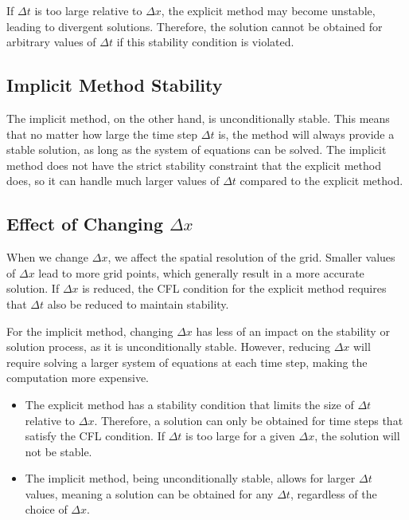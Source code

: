 \documentclass[12pt]{article}
\begin{document}
If \( \Delta t \) is too large relative to \( \Delta x \), the explicit method may become unstable, leading to divergent solutions. Therefore, the solution cannot be obtained for arbitrary values of \( \Delta t \) if this stability condition is violated.

\subsection*{Implicit Method Stability}
The implicit method, on the other hand, is unconditionally stable. This means that no matter how large the time step \( \Delta t \) is, the method will always provide a stable solution, as long as the system of equations can be solved. The implicit method does not have the strict stability constraint that the explicit method does, so it can handle much larger values of \( \Delta t \) compared to the explicit method.

\subsection*{Effect of Changing \( \Delta x \)}
When we change \( \Delta x \), we affect the spatial resolution of the grid. Smaller values of \( \Delta x \) lead to more grid points, which generally result in a more accurate solution. If \( \Delta x \) is reduced, the CFL condition for the explicit method requires that \( \Delta t \) also be reduced to maintain stability. 

For the implicit method, changing \( \Delta x \) has less of an impact on the stability or solution process, as it is unconditionally stable. However, reducing \( \Delta x \) will require solving a larger system of equations at each time step, making the computation more expensive.

\begin{itemize}
    \item The explicit method has a stability condition that limits the size of \( \Delta t \) relative to \( \Delta x \). Therefore, a solution can only be obtained for time steps that satisfy the CFL condition. If \( \Delta t \) is too large for a given \( \Delta x \), the solution will not be stable.
    \item The implicit method, being unconditionally stable, allows for larger \( \Delta t \) values, meaning a solution can be obtained for any \( \Delta t \), regardless of the choice of \( \Delta x \).
\end{itemize}
\end{document}
